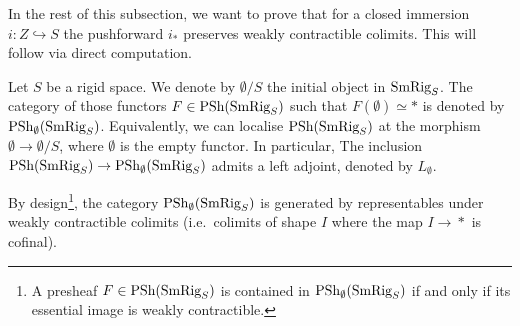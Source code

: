 \documentclass[colorinlistoftodos,article,11pt,reqno]{article}
\newcommand{\SmRig}{\textup{SmRig}}
\newcommand{\PSh}{\textup{PSh}}
\renewcommand{\to}[1][]{\overset{#1}{\rightarrow}}
\newcommand{\inj}[1][]{\overset{#1}{\hookrightarrow}}		%
\newcommand{\es}{\emptyset}
\begin{document}
In the rest of this subsection, we want to prove that for a closed immersion $i\colon Z\inj S$ the pushforward $i_{*}$ preserves weakly contractible colimits. This will follow via direct computation.\par
Let $S$ be a rigid space. We denote by $\es/S$ the initial object in $\SmRig_{S}$. The category of those functors $F\in \PSh(\SmRig_{S})$ such that $F(\es)\simeq \ast$ is denoted by $\PSh_{\es}(\SmRig_{S})$. Equivalently, we can localise $\PSh(\SmRig_{S})$ at the morphism $\es \to \es/S$, where $\es$ is the empty functor.  In particular, The inclusion $\PSh(\SmRig_{S})\to \PSh_{\es}(\SmRig_{S})$ admits a left adjoint, denoted by $L_{\es}$.

\begin{rem}
\label{rem.Pes.gen}
	By design\footnote{A presheaf $F\in\PSh(\SmRig_{S})$ is contained in $\PSh_{\es}(\SmRig_{S})$ if and only if its essential image is weakly contractible.}, the category $\PSh_{\es}(\SmRig_{S})$ is generated by representables under weakly contractible colimits (i.e.\ colimits of shape $I$ where the map $I\to *$ is cofinal).
\end{rem} 
\end{document}
